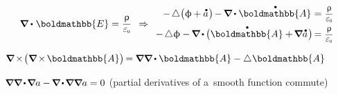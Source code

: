 \nopagebreak\vspace{-0.1em}\begin{equation}\label{electromagnetic.firstequationofwave}
\boldnabla \dotp \hspace{.12ex} \boldmathbb{E} = \displaystyle \frac{\uprho}{\raisemath{.16em}{\vacuumpermittivity}}
\hspace{.44em} \Rightarrow
%
\begin{array}{r@{\hspace{.3em}}c@{\hspace{.3em}}l}
- \hspace{-0.1ex} \Laplacian \bigl( \upphi \hspace{-0.1ex} + \mathdotabove{a} \hspace{.1ex} \bigr) \hspace{-0.2ex} - \hspace{-0.15ex} \boldnabla \hspace{-0.1ex} \dotp \mathdotabove{\boldmathbb{A}} & = & \scalebox{0.9}{$\displaystyle \frac{\uprho}{\raisemath{.16em}{\vacuumpermittivity}}$}
\\[.66em]
- \hspace{-0.1ex} \Laplacian \upphi - \hspace{-0.15ex} \boldnabla \hspace{-0.12ex} \dotp \hspace{-0.12ex} \bigl( \mathdotabove{\boldmathbb{A}} + \hspace{-0.2ex} \boldnabla \mathdotabove{a} \hspace{.15ex} \bigr) \hspace*{-0.33ex} & = & \scalebox{0.9}{$\displaystyle \frac{\uprho}{\raisemath{.16em}{\vacuumpermittivity}}$}
\end{array}
\end{equation}

${\boldnabla \hspace{-0.2ex} \times \hspace{-0.3ex} \bigl( \boldnabla \hspace{-0.2ex} \times \hspace{-0.2ex} \boldmathbb{A} \bigr) \hspace{-0.25ex} = \hspace{-0.1ex} \boldnabla \boldnabla \hspace{-0.1ex} \dotp \boldmathbb{A} - \Laplacian \hspace{.05ex} \boldmathbb{A}}$

${\boldnabla \boldnabla \hspace{-0.2ex} \dotp \hspace{-0.25ex} \boldnabla a - \hspace{-0.15ex} \boldnabla \hspace{-0.2ex} \dotp \hspace{-0.25ex} \boldnabla \boldnabla a = 0}$ (partial derivatives of a~smooth function commute)

